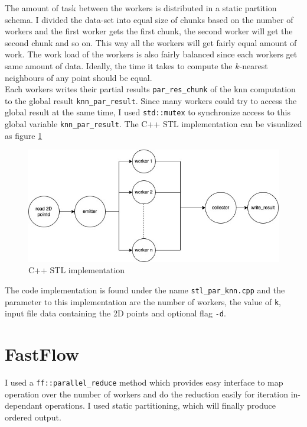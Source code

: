\documentclass[12pt,a4paper]{report}
\begin{document}
The amount of task between the workers is distributed in a static partition schema. I divided the data-set into equal size of chunks based on the number of workers and the first worker gets the first chunk, the second worker will get the second chunk and so on. This way all the workers will get fairly equal amount of work. The work load of the workers is also fairly balanced since each workers get same amount of data. Ideally, the time it takes to compute the $k$-nearest neighbours of any point should be equal. \\

Each workers writes their partial results \verb!par_res_chunk! of the knn computation to the global result \verb!knn_par_result!. Since many workers could try to access the global result at the same time, I used \verb!std::mutex! to synchronize access to this global variable \verb!knn_par_result!. The C++ STL implementation can be visualized as figure \ref{fig:stl_par} \\

\begin{figure}[H]
    \centering
    \includegraphics[width=\textwidth]{images/stl_par.jpg}
    \caption{C++ STL implementation}
    \label{fig:stl_par}
\end{figure}

The code implementation is found under the name \verb!stl_par_knn.cpp! and the parameter to this implementation are the number of workers, the value of \verb!k!, input file data containing the 2D points and optional flag \verb!-d!.

\section{FastFlow}
I used a \verb!ff::parallel_reduce! method which provides easy interface to map operation over the number of workers and do the reduction easily for iteration in-dependant operations. I used static partitioning, which will finally produce ordered output.
\end{document}
